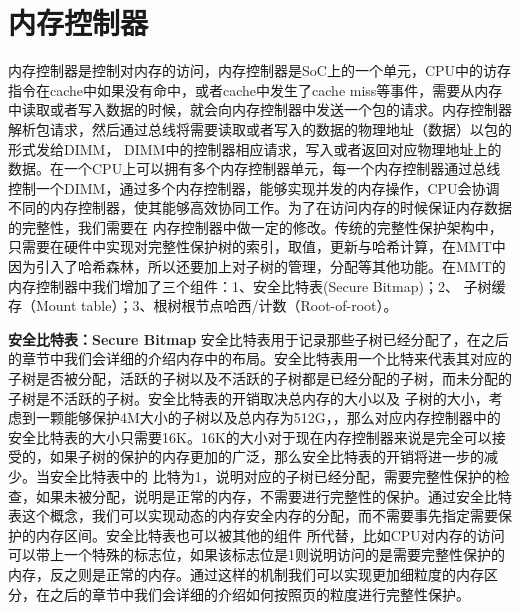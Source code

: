\section{内存控制器}
内存控制器是控制对内存的访问，内存控制器是SoC上的一个单元，CPU中的访存指令在cache中如果没有命中，或者cache中发生了cache miss等事件，需要从内存中读取或者写入数据的时候，就会向内存控制器中发送一个包的请求。内存控制器解析包请求，然后通过总线将需要读取或者写入的数据的物理地址（数据）以包的形式发给DIMM，
DIMM中的控制器相应请求，写入或者返回对应物理地址上的数据。在一个CPU上可以拥有多个内存控制器单元，每一个内存控制器通过总线控制一个DIMM，通过多个内存控制器，能够实现并发的内存操作，CPU会协调不同的内存控制器，使其能够高效协同工作。为了在访问内存的时候保证内存数据的完整性，我们需要在
内存控制器中做一定的修改。传统的完整性保护架构中，只需要在硬件中实现对完整性保护树的索引，取值，更新与哈希计算，在MMT中因为引入了哈希森林，所以还要加上对子树的管理，分配等其他功能。在MMT的内存控制器中我们增加了三个组件：1、安全比特表(Secure Bitmap)；2、
子树缓存（Mount table）；3、根树根节点哈西/计数（Root-of-root）。

\textbf{安全比特表：Secure Bitmap}
安全比特表用于记录那些子树已经分配了，在之后的章节中我们会详细的介绍内存中的布局。安全比特表用一个比特来代表其对应的子树是否被分配，活跃的子树以及不活跃的子树都是已经分配的子树，而未分配的子树是不活跃的子树。安全比特表的开销取决总内存的大小以及
子树的大小，考虑到一颗能够保护4M大小的子树以及总内存为512G，，那么对应内存控制器中的安全比特表的大小只需要16K。16K的大小对于现在内存控制器来说是完全可以接受的，如果子树的保护的内存更加的广泛，那么安全比特表的开销将进一步的减少。当安全比特表中的
比特为1，说明对应的子树已经分配，需要完整性保护的检查，如果未被分配，说明是正常的内存，不需要进行完整性的保护。通过安全比特表这个概念，我们可以实现动态的内存安全内存的分配，而不需要事先指定需要保护的内存区间。安全比特表也可以被其他的组件
所代替，比如CPU对内存的访问可以带上一个特殊的标志位，如果该标志位是1则说明访问的是需要完整性保护的内存，反之则是正常的内存。通过这样的机制我们可以实现更加细粒度的内存区分，在之后的章节中我们会详细的介绍如何按照页的粒度进行完整性保护。

